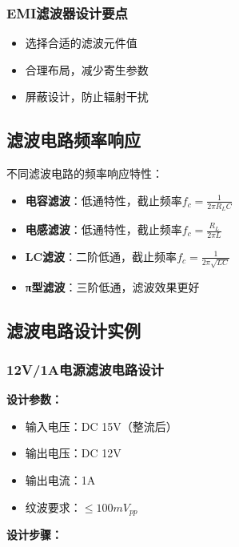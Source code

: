 \documentclass[12pt,UTF8]{ctexbook}
\begin{document}
\subsubsection{EMI滤波器设计要点}
\begin{itemize}
    \item 选择合适的滤波元件值
    \item 合理布局，减少寄生参数
    \item 屏蔽设计，防止辐射干扰
\end{itemize}

\subsection{滤波电路频率响应}

不同滤波电路的频率响应特性：

\begin{itemize}
    \item \textbf{电容滤波}：低通特性，截止频率$f_{c} = \frac{1}{2\pi R_{L}C}$
    \item \textbf{电感滤波}：低通特性，截止频率$f_{c} = \frac{R_{L}}{2\pi L}$
    \item \textbf{LC滤波}：二阶低通，截止频率$f_{c} = \frac{1}{2\pi \sqrt{LC}}$
    \item \textbf{π型滤波}：三阶低通，滤波效果更好
\end{itemize}

\subsection{滤波电路设计实例}

\subsubsection{12V/1A电源滤波电路设计}

\textbf{设计参数：}
\begin{itemize}
    \item 输入电压：DC 15V（整流后）
    \item 输出电压：DC 12V
    \item 输出电流：1A
    \item 纹波要求：$\leq 100mV_{pp}$
\end{itemize}

\textbf{设计步骤：}
\end{document}
